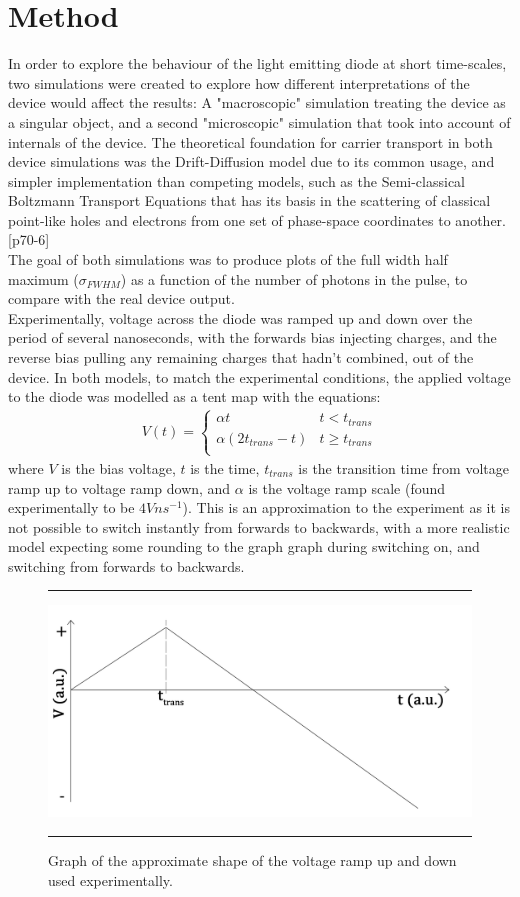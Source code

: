 \documentclass[titlepage]{article}
\begin{document}
\section{Method}\label{sec:Method}
In order to explore the behaviour of the light emitting diode at short time-scales, two simulations were created to explore how different interpretations of the device would affect the results: A "macroscopic" simulation treating the device as a singular object, and a second "microscopic" simulation that took into account of internals of the device. The theoretical foundation for carrier transport in both device simulations was the Drift-Diffusion model due to its common usage, and simpler implementation than competing models, such as the Semi-classical Boltzmann Transport Equations that has its basis in the scattering of classical point-like holes and electrons from one set of phase-space coordinates to another.\cite{NSD}[p70-6] \\
The goal of both simulations was to produce plots of the full width half maximum ($\sigma_{FWHM}$) as a function of the number of photons in the pulse, to compare with the real device output.\\
Experimentally, voltage across the diode was ramped up and down over the period of several nanoseconds, with the forwards bias injecting charges, and the reverse bias pulling any remaining charges that hadn't combined, out of the device. In both models, to match the experimental conditions, the applied voltage to the diode was modelled as a tent map with the equations:
\begin{eqnarray}
	V(t) = \begin{cases}
	\alpha t &t < t_{trans}\\
	\alpha(2t_{trans} - t) &t \geq t_{trans}\\
	\end{cases}
\end{eqnarray}
where $V$ is the bias voltage, $t$ is the time, $t_{trans}$ is the transition time from voltage ramp up to voltage ramp down, and $\alpha$ is the voltage ramp scale (found experimentally to be $4Vns^{-1}$). This is an approximation to the experiment as it is not possible to switch instantly from forwards to backwards, with a more realistic model expecting some rounding to the graph graph during switching on, and switching from forwards to backwards. 
\begin{figure}[t]
	\hrule
	\centering
	\includegraphics[scale=0.12]{Figures/V_tent}
	\caption{\label{graph:V_tent}Graph of the approximate shape of the voltage ramp up and down used experimentally.}
	\hrule
\end{figure}
\end{document}
